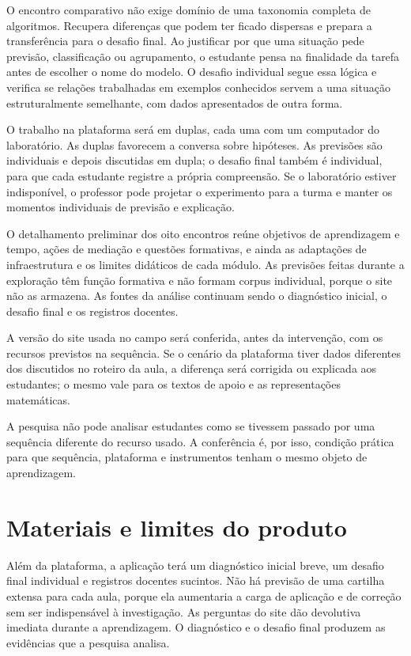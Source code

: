 O encontro comparativo não exige domínio de uma taxonomia completa de algoritmos. Recupera diferenças que podem ter ficado dispersas e prepara a transferência para o desafio final. Ao justificar por que uma situação pede previsão, classificação ou agrupamento, o estudante pensa na finalidade da tarefa antes de escolher o nome do modelo. O desafio individual segue essa lógica e verifica se relações trabalhadas em exemplos conhecidos servem a uma situação estruturalmente semelhante, com dados apresentados de outra forma.

O trabalho na plataforma será em duplas, cada uma com um computador do laboratório. As duplas favorecem a conversa sobre hipóteses. As previsões são individuais e depois discutidas em dupla; o desafio final também é individual, para que cada estudante registre a própria compreensão. Se o laboratório estiver indisponível, o professor pode projetar o experimento para a turma e manter os momentos individuais de previsão e explicação.

O detalhamento preliminar dos oito encontros reúne objetivos de aprendizagem e tempo, ações de mediação e questões formativas, e ainda as adaptações de infraestrutura e os limites didáticos de cada módulo. As previsões feitas durante a exploração têm função formativa e não formam corpus individual, porque o site não as armazena. As fontes da análise continuam sendo o diagnóstico inicial, o desafio final e os registros docentes.

A versão do site usada no campo será conferida, antes da intervenção, com os recursos previstos na sequência. Se o cenário da plataforma tiver dados diferentes dos discutidos no roteiro da aula, a diferença será corrigida ou explicada aos estudantes; o mesmo vale para os textos de apoio e as representações matemáticas.

A pesquisa não pode analisar estudantes como se tivessem passado por uma sequência diferente do recurso usado. A conferência é, por isso, condição prática para que sequência, plataforma e instrumentos tenham o mesmo objeto de aprendizagem.

\section{Materiais e limites do produto}

Além da plataforma, a aplicação terá um diagnóstico inicial breve, um desafio final individual e registros docentes sucintos. Não há previsão de uma cartilha extensa para cada aula, porque ela aumentaria a carga de aplicação e de correção sem ser indispensável à investigação. As perguntas do site dão devolutiva imediata durante a aprendizagem. O diagnóstico e o desafio final produzem as evidências que a pesquisa analisa.

